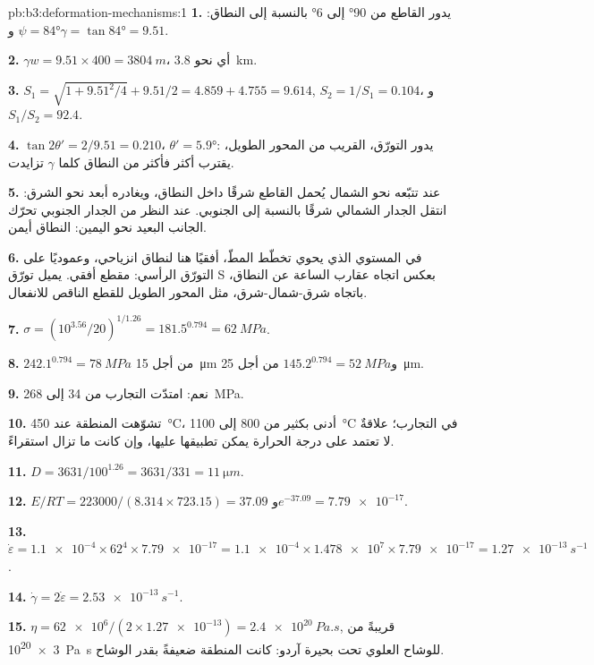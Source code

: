 \begin{solution}{pb:b3:deformation-mechanisms:1}
\textbf{1.} يدور القاطع من \ang{90} إلى \ang{6} بالنسبة إلى النطاق: $\psi =
\ang{84}$ و$\gamma = \tan\ang{84} = 9.51$.

\textbf{2.} $\gamma w = 9.51\times400 = \qty{3804}{m}$، أي نحو \qty{3.8}{km}.

\textbf{3.} $S_1 = \sqrt{1 + 9.51^2/4} + 9.51/2 = 4.859 + 4.755 = 9.614$,
$S_2 = 1/S_1 = 0.104$، و$S_1/S_2 = 92.4$.

\textbf{4.} $\tan2\theta' = 2/9.51 = 0.210$، $\theta' = \ang{5.9}$: يدور
التورّق، القريب من المحور الطويل، يقترب أكثر فأكثر من النطاق كلما $\gamma$
تزايدت.

\textbf{5.} عند تتبّعه نحو الشمال يُحمل القاطع شرقًا داخل النطاق،
ويغادره أبعد نحو الشرق: انتقل الجدار الشمالي شرقًا بالنسبة إلى الجنوبي.
عند النظر من الجدار الجنوبي تحرّك الجانب البعيد نحو اليمين: النطاق
أيمن.

\textbf{6.} في المستوي الذي يحوي تخطّط المطّ، أفقيًا هنا
لنطاق انزياحي، وعموديًا على التورّق الرأسي: مقطع
أفقي. يميل تورّق S بعكس اتجاه عقارب الساعة عن النطاق، باتجاه
شرق-شمال-شرق، مثل المحور الطويل للقطع الناقص للانفعال.

\textbf{7.} $\sigma = (10^{3.56}/20)^{1/1.26} = 181.5^{0.794} = \qty{62}{MPa}$.

\textbf{8.} $242.1^{0.794} = \qty{78}{MPa}$ من أجل \qty{15}{\micro m}
و$145.2^{0.794} = \qty{52}{MPa}$ من أجل \qty{25}{\micro m}.

\textbf{9.} نعم: امتدّت التجارب من 34 إلى \qty{268}{MPa}.

\textbf{10.} تشوّهت المنطقة عند \qty{450}{\celsius}، أدنى بكثير من 800 إلى
\qty{1100}{\celsius} في التجارب؛ علاقةٌ لا تعتمد على
درجة الحرارة يمكن تطبيقها عليها، وإن كانت ما تزال
استقراءً.

\textbf{11.} $D = 3631/100^{1.26} = 3631/331 = \qty{11}{\micro m}$.

\textbf{12.} $E/RT = 223000/(8.314\times723.15) = 37.09$ و$e^{-37.09} =
\num{7.79e-17}$.

\textbf{13.} $\dot\varepsilon = \num{1.1e-4}\times62^4\times\num{7.79e-17} =
\num{1.1e-4}\times\num{1.478e7}\times\num{7.79e-17} = \qty{1.27e-13}{s^{-1}}$.

\textbf{14.} $\dot\gamma = 2\dot\varepsilon = \qty{2.53e-13}{s^{-1}}$.

\textbf{15.} $\eta = \num{62e6}/(2\times\num{1.27e-13}) = \qty{2.4e20}{Pa.s}$,
قريبةً من \qty{3e20}{Pa.s} للوشاح العلوي تحت بحيرة آردو: كانت المنطقة
ضعيفةً بقدر الوشاح.


\end{solution}
